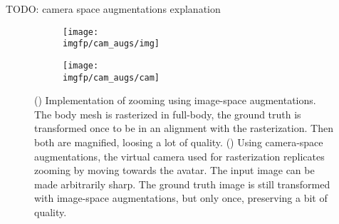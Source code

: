 TODO: camera space augmentations explanation
%

\begin{figure}[ht]
	\centering
	\begin{subfigure}[b]{0.48\textwidth}
		\centering
		\texttt{[image: \\imgfp/cam\_augs/img]}%
		\caption{}
		\label{fig:cam_aug:before}
	\end{subfigure}
	\begin{subfigure}[b]{0.48\textwidth}
		\centering
		\texttt{[image: \\imgfp/cam\_augs/cam]}%
		\caption{}
		\label{fig:cam_aug:after}
	\end{subfigure}
	\caption{(\protect{}) Implementation of zooming using image-space augmentations. The body mesh is rasterized in full-body, the ground truth is transformed once to be in an alignment with the rasterization. Then both are magnified, loosing a lot of quality. (\protect{}) Using camera-space augmentations, the virtual camera used for rasterization replicates zooming by moving towards the avatar. The input image can be made arbitrarily sharp. The ground truth image is still transformed with image-space augmentations, but only once, preserving a bit of quality.}
	\label{fig:cam_aug}
\end{figure}

